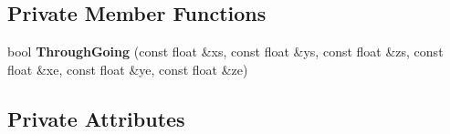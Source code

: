 \subsection*{Private Member Functions}
\begin{DoxyCompactItemize}
\item 
\hypertarget{classMuCSFlashMatch_a7eb5d8ee16d0da0844dd029c3ca8e03e}{bool {\bfseries Through\-Going} (const float \&xs, const float \&ys, const float \&zs, const float \&xe, const float \&ye, const float \&ze)}\label{classMuCSFlashMatch_a7eb5d8ee16d0da0844dd029c3ca8e03e}

\end{DoxyCompactItemize}
\subsection*{Private Attributes}
